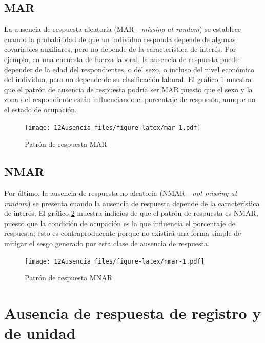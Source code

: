 \documentclass[
  12pt,
  spanish,
]{book}
\begin{document}
\hypertarget{mar}{%
\subsection{MAR}\label{mar}}

La ausencia de respuesta aleatoria (MAR - \emph{missing at random}) se establece cuando la probabilidad de que un individuo responda depende de algunas covariables auxiliares, pero no depende de la característica de interés. Por ejemplo, en una encuesta de fuerza laboral, la ausencia de respuesta puede depender de la edad del respondientes, o del sexo, o incluso del nivel económico del individuo, pero no depende de su clasificación laboral. El gráfico \ref{fig:mar} muestra que el patrón de ausencia de respuesta podría ser MAR puesto que el sexo y la zona del respondiente están influenciando el porcentaje de respuesta, aunque no el estado de ocupación.

\begin{figure}
\centering
\texttt{[image: 12Ausencia\_files/figure-latex/mar-1.pdf]}
\caption{\label{fig:mar}Patrón de respuesta MAR}
\end{figure}

\hypertarget{nmar}{%
\subsection{NMAR}\label{nmar}}

Por último, la ausencia de respuesta no aleatoria (NMAR - \emph{not missing at random}) se presenta cuando la ausencia de respuesta depende de la característica de interés. El gráfico \ref{fig:nmar} muestra indicios de que el patrón de respuesta es NMAR, puesto que la condición de ocupación es la que influencia el porcentaje de respuesta; esto es contraproducente porque no existirá una forma simple de mitigar el sesgo generado por esta clase de ausencia de respuesta.

\begin{figure}
\centering
\texttt{[image: 12Ausencia\_files/figure-latex/nmar-1.pdf]}
\caption{\label{fig:nmar}Patrón de respuesta MNAR}
\end{figure}

\hypertarget{ausencia-de-respuesta-de-registro-y-de-unidad}{%
\section{Ausencia de respuesta de registro y de unidad}\label{ausencia-de-respuesta-de-registro-y-de-unidad}}
\end{document}
